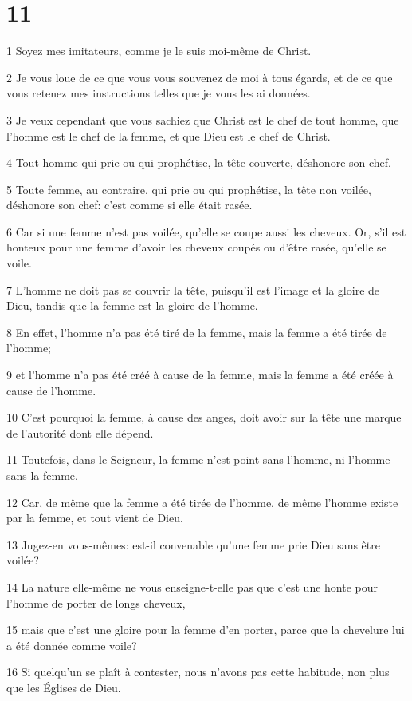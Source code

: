 \chapter{11}

\par 1 Soyez mes imitateurs, comme je le suis moi-même de Christ.
\par 2 Je vous loue de ce que vous vous souvenez de moi à tous égards, et de ce que vous retenez mes instructions telles que je vous les ai données.
\par 3 Je veux cependant que vous sachiez que Christ est le chef de tout homme, que l'homme est le chef de la femme, et que Dieu est le chef de Christ.
\par 4 Tout homme qui prie ou qui prophétise, la tête couverte, déshonore son chef.
\par 5 Toute femme, au contraire, qui prie ou qui prophétise, la tête non voilée, déshonore son chef: c'est comme si elle était rasée.
\par 6 Car si une femme n'est pas voilée, qu'elle se coupe aussi les cheveux. Or, s'il est honteux pour une femme d'avoir les cheveux coupés ou d'être rasée, qu'elle se voile.
\par 7 L'homme ne doit pas se couvrir la tête, puisqu'il est l'image et la gloire de Dieu, tandis que la femme est la gloire de l'homme.
\par 8 En effet, l'homme n'a pas été tiré de la femme, mais la femme a été tirée de l'homme;
\par 9 et l'homme n'a pas été créé à cause de la femme, mais la femme a été créée à cause de l'homme.
\par 10 C'est pourquoi la femme, à cause des anges, doit avoir sur la tête une marque de l'autorité dont elle dépend.
\par 11 Toutefois, dans le Seigneur, la femme n'est point sans l'homme, ni l'homme sans la femme.
\par 12 Car, de même que la femme a été tirée de l'homme, de même l'homme existe par la femme, et tout vient de Dieu.
\par 13 Jugez-en vous-mêmes: est-il convenable qu'une femme prie Dieu sans être voilée?
\par 14 La nature elle-même ne vous enseigne-t-elle pas que c'est une honte pour l'homme de porter de longs cheveux,
\par 15 mais que c'est une gloire pour la femme d'en porter, parce que la chevelure lui a été donnée comme voile?
\par 16 Si quelqu'un se plaît à contester, nous n'avons pas cette habitude, non plus que les Églises de Dieu.
